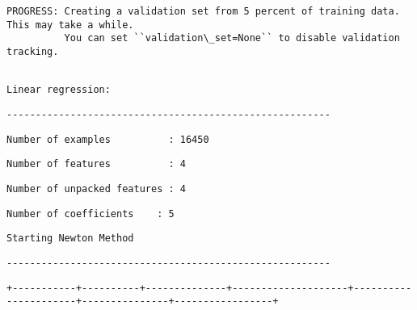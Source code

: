 \documentclass[11pt]{article}
\begin{document}
    \begin{Verbatim}[commandchars=\\\{\}]
PROGRESS: Creating a validation set from 5 percent of training data. This may take a while.
          You can set ``validation\_set=None`` to disable validation tracking.


    \end{Verbatim}

    
    \begin{verbatim}
Linear regression:
    \end{verbatim}

    
    
    \begin{verbatim}
--------------------------------------------------------
    \end{verbatim}

    
    
    \begin{verbatim}
Number of examples          : 16450
    \end{verbatim}

    
    
    \begin{verbatim}
Number of features          : 4
    \end{verbatim}

    
    
    \begin{verbatim}
Number of unpacked features : 4
    \end{verbatim}

    
    
    \begin{verbatim}
Number of coefficients    : 5
    \end{verbatim}

    
    
    \begin{verbatim}
Starting Newton Method
    \end{verbatim}

    
    
    \begin{verbatim}
--------------------------------------------------------
    \end{verbatim}

    
    
    \begin{verbatim}
+-----------+----------+--------------+--------------------+----------------------+---------------+-----------------+
    \end{verbatim}
\end{document}
